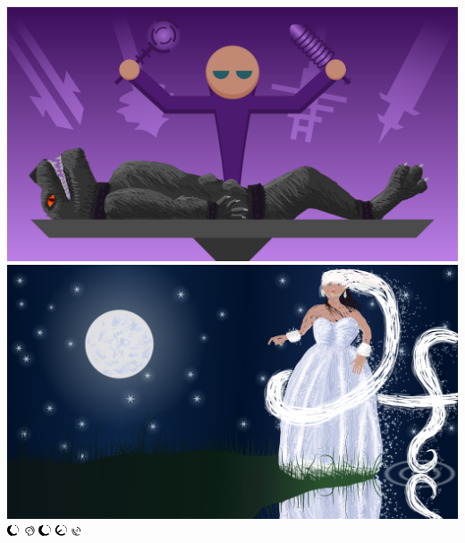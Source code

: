 \documentclass[a4paper,12pt]{book}
\begin{document}
\includegraphics[width=\textwidth]{./img/werewolf.png}
\clearpage%
\includegraphics[width=\textwidth]{./img/tort.png}
\clearpage%
\includegraphics[height=0.9em]{./chars/kula.pdf}
\clearpage%
\includegraphics[height=0.9em]{./chars/monster.pdf}
\clearpage%
\includegraphics[height=0.9em]{./chars/kula.pdf}
\clearpage%
\includegraphics[height=0.9em]{./chars/profesor.pdf}
\clearpage%
\includegraphics[height=0.9em]{./chars/monster_language.pdf}
\clearpage%
\end{document}
